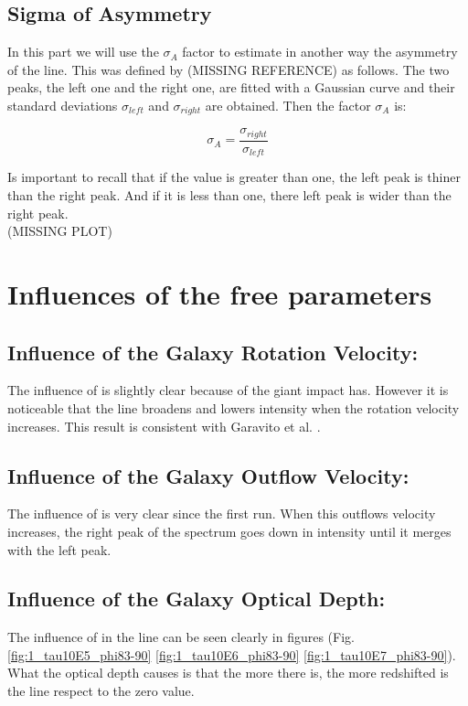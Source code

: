\subsection{Sigma of Asymmetry}
In this part we will use the $\sigma_A$ factor to estimate in another way the asymmetry of the \lya line. This was defined by (MISSING REFERENCE) as follows. The two peaks, the left one and the right one, are fitted with a Gaussian curve and their standard deviations $\sigma_{left}$ and $\sigma_{right}$ are obtained. Then the factor $\sigma_A$ is:

\begin{equation}
\sigma_A = \frac{\sigma_{right}}{\sigma_{left}}
\end{equation}

Is important to recall that if the value is greater than one, the left peak is thiner than the right peak. And if it is less than one, there left peak is wider than the right peak.\\

(MISSING PLOT)

\section{Influences of the free parameters}

\subsection{Influence of the Galaxy Rotation Velocity: \vrot}
The influence of \vrot is slightly clear because of the giant impact \vout has. However it is noticeable that the \lya line broadens and lowers intensity when the rotation velocity increases. This result is consistent with Garavito et al. \cite{Garavito14}. \\

\subsection{Influence of the Galaxy Outflow Velocity: \vout}
The influence of \vout is very clear since the first run. When this outflows velocity increases, the right peak of the spectrum goes down in intensity until it merges with the left peak. \\

\subsection{Influence of the Galaxy Optical Depth: \tauh}
The influence of \tauh in the \lya line can be seen clearly in figures (Fig. \ref{fig:1_tau10E5_phi83-90} \ref{fig:1_tau10E6_phi83-90} \ref{fig:1_tau10E7_phi83-90}). What the optical depth causes is that the more \tauh there is, the more redshifted is the line respect to the zero value. \\